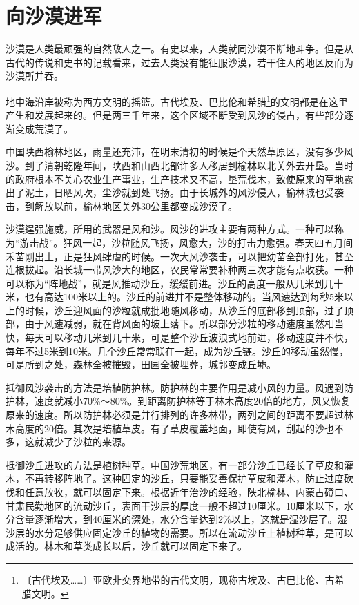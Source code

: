 \documentclass[12pt,UTF-8,openany]{ctexbook}
\begin{document}
\chapter{向沙漠进军}

\begin{normalsize}
    
    沙漠是人类最顽强的自然敌人之一。有史以来，人类就同沙漠不断地斗争。但是从古代的传说和史书的记载看来，过去人类没有能征服沙漠，若干住人的地区反而为沙漠所并吞。
    
    地中海沿岸被称为西方文明的摇篮。古代埃及、巴比伦和希腊\footnote{〔古代埃及……〕亚欧非交界地带的古代文明，现称古埃及、古巴比伦、古希腊文明。}的文明都是在这里产生和发展起来的。但是两三千年来，这个区域不断受到风沙的侵占，有些部分逐渐变成荒漠了。
    
    中国陕西榆林地区，雨量还充沛，在明末清初的时候是个天然草原区，没有多少风沙。到了清朝乾隆年间，陕西和山西北部许多人移居到榆林以北关外去开垦。当时的政府根本不关心农业生产事业，生产技术又不高，垦荒伐木，致使原来的草地露出了泥土，日晒风吹，尘沙就到处飞扬。由于长城外的风沙侵入，榆林城也受袭击，到解放以前，榆林地区关外30公里都变成沙漠了。
    
    沙漠逞强施威，所用的武器是风和沙。风沙的进攻主要有两种方式。一种可以称为“游击战”。狂风一起，沙粒随风飞扬，风愈大，沙的打击力愈强。春天四五月间禾苗刚出土，正是狂风肆虐的时候。一次大风沙袭击，可以把幼苗全部打死，甚至连根拔起。沿长城一带风沙大的地区，农民常常要补种两三次才能有点收获。一种可以称为“阵地战”，就是风推动沙丘，缓缓前进。沙丘的高度一般从几米到几十米，也有高达100米以上的。沙丘的前进并不是整体移动的。当风速达到每秒5米以上的时候，沙丘迎风面的沙粒就成批地随风移动，从沙丘的底部移到顶部，过了顶部，由于风速减弱，就在背风面的坡上落下。所以部分沙粒的移动速度虽然相当快，每天可以移动几米到几十米，可是整个沙丘波浪式地前进，移动速度并不快，每年不过5米到10米。几个沙丘常常联在一起，成为沙丘链。沙丘的移动虽然慢，可是所到之处，森林全被摧毁，田园全被埋葬，城郭变成丘墟。
    
    抵御风沙袭击的方法是培植防护林。防护林的主要作用是减小风的力量。风遇到防护林，速度就减小70\%～80\%。到距离防护林等于林木高度20倍的地方，风又恢复原来的速度。所以防护林必须是并行排列的许多林带，两列之间的距离不要超过林木高度的20倍。其次是培植草皮。有了草皮覆盖地面，即使有风，刮起的沙也不多，这就减少了沙粒的来源。
    
    抵御沙丘进攻的方法是植树种草。中国沙荒地区，有一部分沙丘已经长了草皮和灌木，不再转移阵地了。这种固定的沙丘，只要能妥善保护草皮和灌木，防止过度砍伐和任意放牧，就可以固定下来。根据近年治沙的经验，陕北榆林、内蒙古磴口、甘肃民勤地区的流动沙丘，表面干沙层的厚度一般不超过10厘米。10厘米以下，水分含量逐渐增大，到40厘米的深处，水分含量达到2\%以上，这就是湿沙层了。湿沙层的水分足够供应固定沙丘的植物的需要。所以在流动沙丘上植树种草，是可以成活的。林木和草类成长以后，沙丘就可以固定下来了。
    

\end{normalsize}
\end{document}
